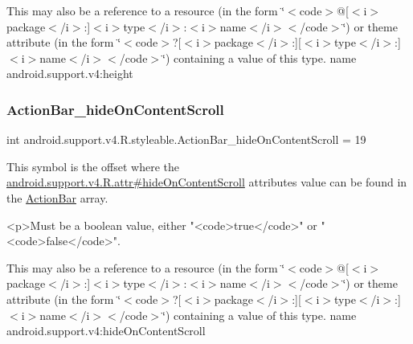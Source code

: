 This may also be a reference to a resource (in the form \char`\"{}$<$code$>$@\mbox{[}$<$i$>$package$<$/i$>$\+:\mbox{]}$<$i$>$type$<$/i$>$\+:$<$i$>$name$<$/i$>$$<$/code$>$\char`\"{}) or theme attribute (in the form \char`\"{}$<$code$>$?\mbox{[}$<$i$>$package$<$/i$>$\+:\mbox{]}\mbox{[}$<$i$>$type$<$/i$>$\+:\mbox{]}$<$i$>$name$<$/i$>$$<$/code$>$\char`\"{}) containing a value of this type.  name android.\+support.\+v4\+:height \mbox{\label{classandroid_1_1support_1_1v4_1_1R_1_1styleable_a34d5eac32f5d297f42d6d9d3a885891b}} 
\subsubsection{\texorpdfstring{Action\+Bar\+\_\+hide\+On\+Content\+Scroll}{ActionBar\_hideOnContentScroll}}
{\footnotesize\ttfamily int android.\+support.\+v4.\+R.\+styleable.\+Action\+Bar\+\_\+hide\+On\+Content\+Scroll = 19\hspace{0.3cm}{\ttfamily [static]}}

This symbol is the offset where the \hyperlink{classandroid_1_1support_1_1v4_1_1R_1_1attr_aa4d568c6c84659b535243051a2556f57}{android.\+support.\+v4.\+R.\+attr\#hide\+On\+Content\+Scroll} attribute\textquotesingle{}s value can be found in the \hyperlink{classandroid_1_1support_1_1v4_1_1R_1_1styleable_adc5a3492b9c46265760d7120a04d6afa}{Action\+Bar} array.

\begin{DoxyVerb}      <p>Must be a boolean value, either "<code>true</code>" or "<code>false</code>".
\end{DoxyVerb}
 

This may also be a reference to a resource (in the form \char`\"{}$<$code$>$@\mbox{[}$<$i$>$package$<$/i$>$\+:\mbox{]}$<$i$>$type$<$/i$>$\+:$<$i$>$name$<$/i$>$$<$/code$>$\char`\"{}) or theme attribute (in the form \char`\"{}$<$code$>$?\mbox{[}$<$i$>$package$<$/i$>$\+:\mbox{]}\mbox{[}$<$i$>$type$<$/i$>$\+:\mbox{]}$<$i$>$name$<$/i$>$$<$/code$>$\char`\"{}) containing a value of this type.  name android.\+support.\+v4\+:hide\+On\+Content\+Scroll \mbox{\label{classandroid_1_1support_1_1v4_1_1R_1_1styleable_afcf7f4cdfdc06edf00b3dde2479d7702}} 
